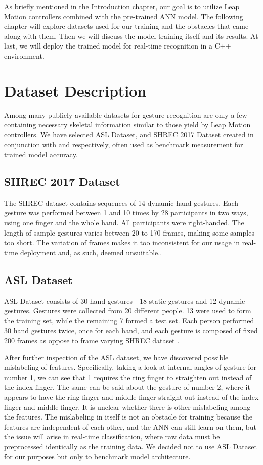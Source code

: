 
As briefly mentioned in the Introduction chapter, our goal is to utilize Leap Motion controllers combined with the pre-trained ANN model. The following chapter will explore datasets used for our training and the obstacles that came along with them. Then we will discuss the model training itself and its results. At last, we will deploy the trained model for real-time recognition in a C++ environment.


\section{Dataset Description}

Among many publicly available datasets for gesture recognition are only a few containing necessary skeletal information similar to those yield by Leap Motion controllers. We have selected ASL Dataset, and SHREC 2017 Dataset created in conjunction with \cite{avola} and \cite{shrec} respectively, often used as benchmark measurement for trained model accuracy.

\subsection{SHREC 2017 Dataset}

The SHREC dataset contains sequences of 14 dynamic hand gestures. Each gesture was performed between 1 and 10 times by 28 participants in two ways, using one finger and the whole hand. All participants were right-handed. The length of sample gestures varies between 20 to 170 frames, making some samples too short. The variation of frames makes it too inconsistent for our usage in real-time deployment and, as such, deemed unsuitable..

\subsection{ASL Dataset}

ASL Dataset consists of 30 hand gestures - 18 static gestures and 12 dynamic gestures. Gestures were collected from 20 different people. 13 were used to form the training set, while the remaining 7 formed a test set. Each person performed 30 hand gestures twice, once for each hand, and each gesture is composed of fixed 200 frames as oppose to frame varying SHREC dataset \cite{avola}. 

After further inspection of the ASL dataset, we have discovered possible mislabeling of features. Specifically, taking a look at internal angles of gesture for number 1, we can see that 1 requires the ring finger to straighten out instead of the index finger. The same can be said about the gesture of number 2, where it appears to have the ring finger and middle finger straight out instead of the index finger and middle finger. It is unclear whether there is other mislabeling among the features. The mislabeling in itself is not an obstacle for training because the features are independent of each other, and the ANN can still learn on them, but the issue will arise in real-time classification, where raw data must be preprocessed identically as the training data. We decided not to use ASL Dataset for our purposes but only to benchmark model architecture.


